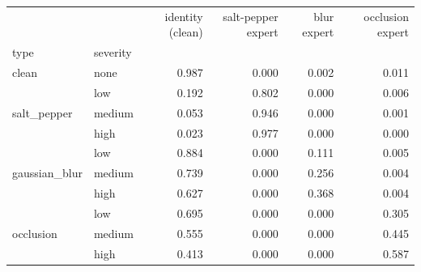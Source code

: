 \begin{tabular}{llrrrr}
\toprule
 &  & identity (clean) & salt-pepper expert & blur expert & occlusion expert \\
type & severity &  &  &  &  \\
\midrule
clean & none & 0.987 & 0.000 & 0.002 & 0.011 \\
\cline{1-6}
\multirow[t]{3}{*}{salt_pepper} & low & 0.192 & 0.802 & 0.000 & 0.006 \\
 & medium & 0.053 & 0.946 & 0.000 & 0.001 \\
 & high & 0.023 & 0.977 & 0.000 & 0.000 \\
\cline{1-6}
\multirow[t]{3}{*}{gaussian_blur} & low & 0.884 & 0.000 & 0.111 & 0.005 \\
 & medium & 0.739 & 0.000 & 0.256 & 0.004 \\
 & high & 0.627 & 0.000 & 0.368 & 0.004 \\
\cline{1-6}
\multirow[t]{3}{*}{occlusion} & low & 0.695 & 0.000 & 0.000 & 0.305 \\
 & medium & 0.555 & 0.000 & 0.000 & 0.445 \\
 & high & 0.413 & 0.000 & 0.000 & 0.587 \\
\cline{1-6}
\bottomrule
\end{tabular}
